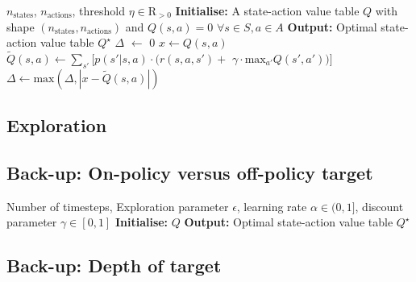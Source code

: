 \documentclass{article}
\theoremstyle{plain}
\theoremstyle{definition}
\theoremstyle{remark}
\begin{document}
\begin{algorithm}[H]
   \caption{Tabular Q-value iteration}
   \label{alg:Q_value_iteration}
\begin{algorithmic}
    $n_\text{states}$, $n_\text{actions}$, threshold $\eta \in\mathrm{R}_{>0}$
   \STATE \textbf{Initialise:} A state-action value table $Q$ with shape $(n_\text{states},n_\text{actions})$ and $Q(s,a)=0$ $\forall s\in S, a \in A$
   \STATE \textbf{Output:} Optimal state-action value table $Q^\star$
   \REPEAT
   \STATE $\Delta$ $\leftarrow$ 0
   \STATE $x \leftarrow Q(s,a)$ \\
   \STATE $\tilde{Q}(s,a) \leftarrow \sum_{s'}[p(s'|s,a) \cdot (r(s,a,s')+$
   \STATE $\gamma \cdot \text{max}_{a'}Q(s',a'))]$ \\
   \STATE $\Delta \leftarrow \text{max}\left(\Delta,|x - \tilde{Q}(s,a)|\right)$
   \ENDFOR
   \ENDFOR
   \UNTIL{$\Delta < \eta$}
\end{algorithmic}
\end{algorithm}

\subsection{Exploration}\label{subsec:exploration}
\begin{algorithm}[H]
\caption{Tabular Q-learning}
\label{alg:Q_learning}
\begin{algorithmic}
    \STATE
\end{algorithmic}
\end{algorithm}

\subsection{Back-up: On-policy versus off-policy target}\label{subsec:back_up_on_off}

\begin{algorithm}[H]
\caption{Tabular SARSA}
\label{alg:SARSA}
\begin{algorithmic}
     Number of timesteps, Exploration parameter $\epsilon$, learning rate $\alpha\in(0,1]$, discount parameter $\gamma\in[0,1]$
   \STATE \textbf{Initialise:} $Q$
   \STATE \textbf{Output:} Optimal state-action value table $Q^\star$
\end{algorithmic}
\end{algorithm}

\subsection{Back-up: Depth of target}\label{subsec:back_up_depth}
\end{document}

